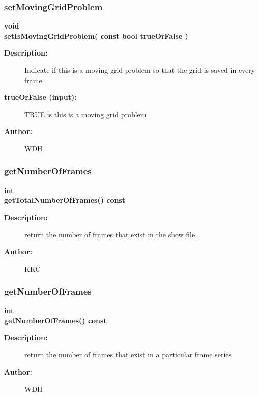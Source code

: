 \subsubsection{setMovingGridProblem}
 
\begin{flushleft} \textbf{%
void  \\ 
\settowidth{\OgshowIncludeArgIndent}{setIsMovingGridProblem(}%
setIsMovingGridProblem( const bool trueOrFalse )
}\end{flushleft}
\begin{description}
\item[{\bf Description:}] 
     Indicate if this is a moving grid problem so that the grid is saved in every frame
\item[{\bf trueOrFalse (input):}]  TRUE is this is a moving grid problem
\item[{\bf Author:}]  WDH
\end{description}
\subsubsection{getNumberOfFrames}
 
\begin{flushleft} \textbf{%
int  \\ 
\settowidth{\OgshowIncludeArgIndent}{getTotalNumberOfFrames(}%
getTotalNumberOfFrames() const
}\end{flushleft}
\begin{description}
\item[{\bf Description:}] 
   return the number of frames that exist in the show file.
\item[{\bf Author:}]  KKC
\end{description}
\subsubsection{getNumberOfFrames}
 
\begin{flushleft} \textbf{%
int  \\ 
\settowidth{\OgshowIncludeArgIndent}{getNumberOfFrames(}%
getNumberOfFrames() const
}\end{flushleft}
\begin{description}
\item[{\bf Description:}] 
   return the number of frames that exist in a particular frame series
\item[{\bf Author:}]  WDH
\end{description}
